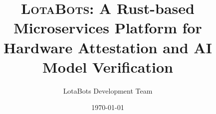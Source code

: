 \documentclass[11pt]{article}
\newcommand{\sysname}{\textsc{LotaBots}}
\begin{document}
\title{\sysname{}: A Rust-based Microservices Platform for\\Hardware Attestation and AI Model Verification}
\author{LotaBots Development Team}
\date{\today}

\maketitle









\end{document}

